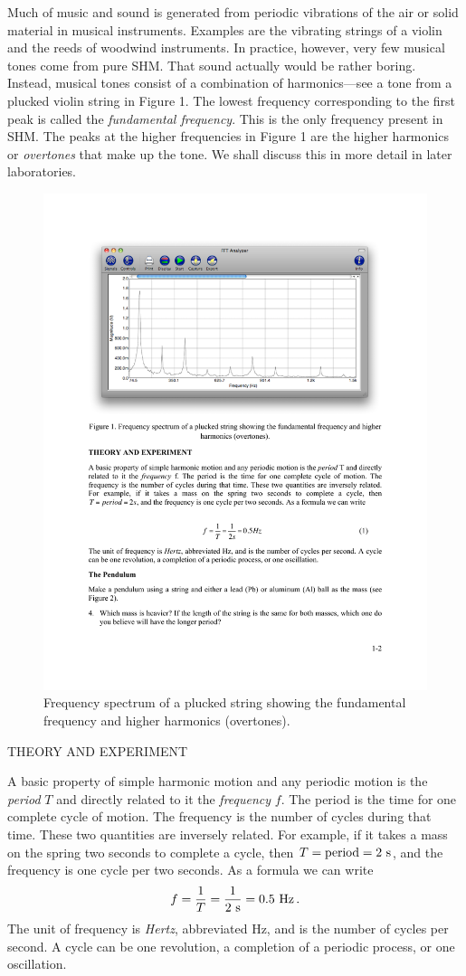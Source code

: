 \documentclass[11pt]{NSF}
\def\be{\begin{equation}}
\def\ee{\end{equation}}
\begin{document}
Much of music and sound is generated from periodic vibrations of the air or
solid material in musical instruments. Examples are the vibrating strings of a
violin and the reeds of woodwind instruments. In practice, however, very few
musical tones come from pure SHM. That sound actually would be rather boring.
Instead, musical tones consist of a combination of harmonics---see a tone from
a plucked violin string in Figure 1. The lowest frequency corresponding to the
first peak is called the {\em fundamental frequency}. 
This is the only frequency present in SHM. 
The peaks at the higher frequencies in Figure 1 are the higher
harmonics or {\em overtones} that make up the tone. 
We shall discuss this in more detail in later laboratories.
%
\begin{figure}[hbtp]
\begin{center}
\includegraphics[width=.75\textwidth]{fig1_1}
\caption{Frequency spectrum of a plucked string showing the 
fundamental frequency and higher harmonics (overtones).}
\label{f:1}
\end{center}
\end{figure}
%

THEORY AND EXPERIMENT

A basic property of simple harmonic motion and any periodic motion is the
{\em period} $T$ and directly related to it the {\em frequency} $f$. 
The period is the time for one complete cycle of motion. 
The frequency is the number of cycles during that time. 
These two quantities are inversely related. 
For example, if it takes a mass on the spring two seconds to complete a 
cycle, then $T = {\rm period} = 2~{\rm s}$, 
and the frequency is one cycle per two seconds. As a formula we can
write 
\be
f = \frac{1}{T} = \frac{1}{2~{\rm s}} = 0.5~{\rm Hz}\,.
\ee
The unit of frequency is {\em Hertz}, abbreviated Hz, and is the number of cycles per second. 
A cycle can be one revolution, a completion of a periodic process, or one oscillation.
\end{document}
